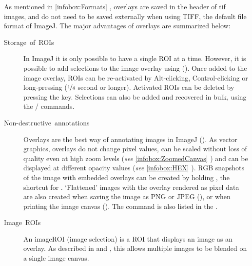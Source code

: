 As mentioned in \ref{infobox:Formats} ,
overlays are saved in the header of tif images, and do not need to
be saved externally when using TIFF, the default file format of ImageJ.
The major advantages of overlays are summarized below:
\begin{description}
\item [{Storage\ of\ ROIs}] In ImageJ it is only possible to have a single
ROI at a time. However, it is possible to add selections to the image
overlay using  ().\feature{}
Once added to the image overlay, ROIs can be re-activated by Alt-clicking,
Control-clicking or long-pressing ($\nicefrac{1}{4}$ second or longer).
Activated ROIs can be deleted by pressing the 
key. Selections can also be added and recovered in bulk, using the
/
commands.
\item [{Non-destructive\ annotations}] Overlays are the best way of annotating
images in ImageJ (). As vector graphics,
overlays do not change pixel values, can be scaled without loss of
quality even at high zoom levels (\emph{see} \ref{infobox:ZoomedCanvas}
) and can be displayed at different
opacity values (\emph{see} \ref{infobox:HEX} ).
RGB snapshots of the image with embedded overlays can be created by
holding  , the shortcut for .
`Flattened' images with the overlay rendered as pixel data are also
created when saving the image as PNG or JPEG (),
or when printing the image canvas ().
The  command is also listed in the .
\item [{Image\ ROIs}] An imageROI
(image selection) is a ROI that displays an image as an overlay. As
described in 
and ,
this allows multiple images to be blended on a single
image canvas.
\end{description}

